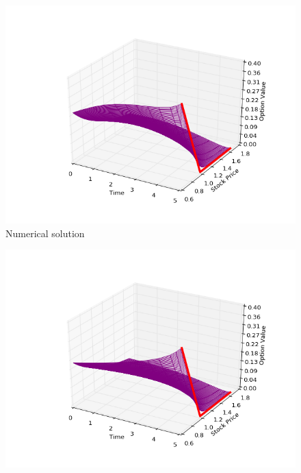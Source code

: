 \documentclass[11pt,a4paper]{extarticle}
\begin{document}
\begin{minipage}{\linewidth}
      \centering
      \begin{minipage}{0.29\linewidth}
          \begin{figure}[H]
              \includegraphics[width=\linewidth]{Figures/eu-put-num}
              \caption{Numerical solution}
          \end{figure}
      \end{minipage}
      \hspace{0.04\linewidth}
      \begin{minipage}{0.29\linewidth}
          \begin{figure}[H]
              \includegraphics[width=\linewidth]{Figures/eu-put-analyt}

\end{figure}
\end{minipage}
\end{minipage}
\end{document}

